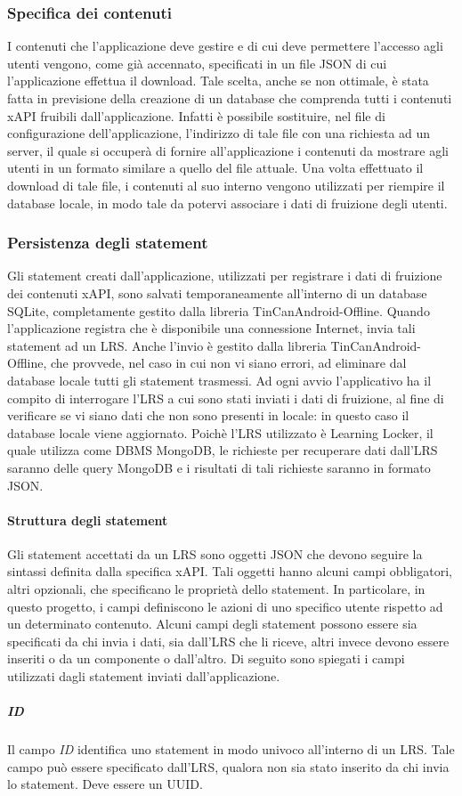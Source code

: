 \documentclass[../Tesi.tex]{subfiles}
\begin{document}
			\subsubsection{Specifica dei contenuti}
			I contenuti che l'applicazione deve gestire e di cui deve permettere l'accesso agli utenti vengono, come già accennato, specificati in un file JSON di cui l'applicazione effettua il download. Tale scelta, anche se non ottimale, è stata fatta in previsione della creazione di un database che comprenda tutti i contenuti xAPI fruibili dall'applicazione. Infatti è possibile sostituire, nel file di configurazione dell'applicazione, l'indirizzo di tale file con una richiesta ad un server, il quale si occuperà di fornire all'applicazione i contenuti da mostrare agli utenti in un formato similare a quello del file attuale. Una volta effettuato il download di tale file, i contenuti al suo interno vengono utilizzati per riempire il database locale, in modo tale da potervi associare i dati di fruizione degli utenti.

			\subsubsection{Persistenza degli statement}
			Gli statement creati dall'applicazione, utilizzati per registrare i dati di fruizione dei contenuti xAPI, sono salvati temporaneamente all'interno di un database SQLite, completamente gestito dalla libreria TinCanAndroid-Offline. Quando l'applicazione registra che è disponibile una connessione Internet, invia tali statement ad un LRS. Anche l'invio è gestito dalla libreria TinCanAndroid-Offline, che provvede, nel caso in cui non vi siano errori, ad eliminare dal database locale tutti gli statement trasmessi. Ad ogni avvio l'applicativo ha il compito di interrogare l'LRS a cui sono stati inviati i dati di fruizione, al fine di verificare se vi siano dati che non sono presenti in locale: in questo caso il database locale viene aggiornato. Poichè l'LRS utilizzato è Learning Locker, il quale utilizza come DBMS MongoDB, le richieste per recuperare dati dall'LRS saranno delle query MongoDB e i risultati di tali richieste saranno in formato JSON.
				\paragraph{Struttura degli statement}
				Gli statement accettati da un LRS sono oggetti JSON che devono seguire la sintassi definita dalla specifica xAPI. Tali oggetti hanno alcuni campi obbligatori, altri opzionali, che specificano le proprietà dello statement. In particolare, in questo progetto, i campi definiscono le azioni di uno specifico utente rispetto ad un determinato contenuto. Alcuni campi degli statement possono essere sia specificati da chi invia i dati, sia dall'LRS che li riceve, altri invece devono essere inseriti o da un componente o dall'altro. Di seguito sono spiegati i campi utilizzati dagli statement inviati dall'applicazione.
					\subparagraph{ID}
					Il campo \textit{ID} identifica uno statement in modo univoco all'interno di un LRS. Tale campo può essere specificato dall'LRS, qualora non sia stato inserito da chi invia lo statement. Deve essere un UUID.
\end{document}
